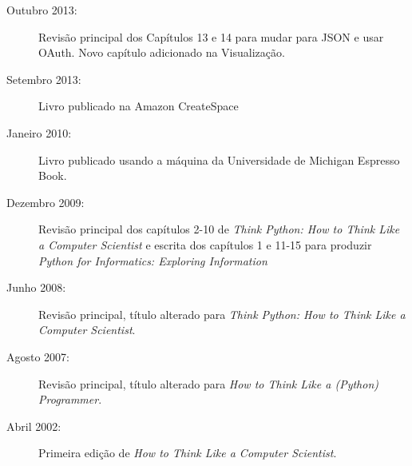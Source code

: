 \begin{latexonly}
{\begin{description}
\item[Outubro 2013:] Revisão principal dos Capítulos 13 e 14 para mudar para
	JSON e usar OAuth. Novo capítulo adicionado na Visualização.

\item[Setembro 2013:] Livro publicado na Amazon CreateSpace

\item[Janeiro 2010:] Livro publicado usando a máquina da Universidade de
	Michigan Espresso Book.

\item[Dezembro 2009:] Revisão principal dos capítulos 2-10 de \emph{Think
		Python: How to Think Like a Computer Scientist} e escrita dos
	capítulos 1 e 11-15 para produzir \emph{Python for Informatics: Exploring
		Information}

\item[Junho 2008:] Revisão principal, título alterado para \emph{Think Python:
		How to Think Like a Computer Scientist}.

\item[Agosto 2007:] Revisão principal, título alterado para \emph{How to Think
		Like a (Python) Programmer}.

\item[Abril 2002:] Primeira edição de \emph{How to Think Like a Computer
		Scientist}.

\end{description}

}
\end{latexonly}
